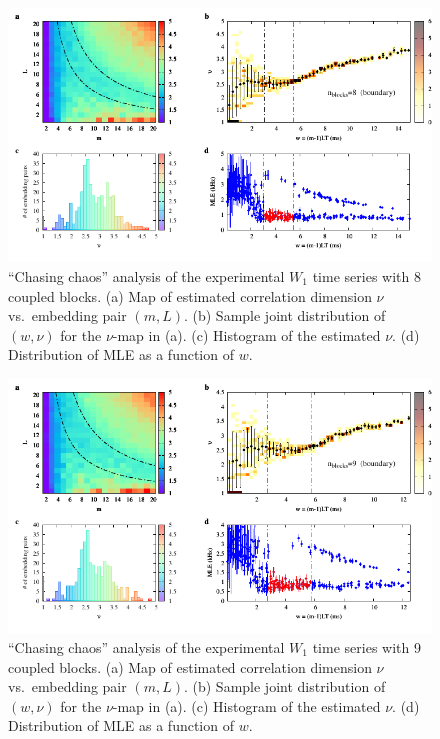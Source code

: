 \begin{appendices}
\begin{figure}[!htbp]
    \centering
    \includegraphics[width=\linewidth]{../blocks/8_blocks/2e5_points/plots/chaos_low.pdf}
    \caption{``Chasing chaos'' analysis of the experimental $W_1$ time series with 8 coupled blocks.
    (a) Map of estimated correlation dimension $\nu$ vs.\ embedding pair $(m, L)$.
    (b) Sample joint distribution of $(w,\nu)$ for the $\nu$-map in (a).
    (c) Histogram of the estimated $\nu$. (d) Distribution of MLE as a function of $w$.
    } 
\end{figure}

\begin{figure}[!htbp]
    \centering
    \includegraphics[width=\linewidth]{../blocks/9_blocks/edge/2e5_points/plots/chaos_low.pdf}
    \caption{``Chasing chaos'' analysis of the experimental $W_1$ time series with 9 coupled blocks.
    (a) Map of estimated correlation dimension $\nu$ vs.\ embedding pair $(m, L)$.
    (b) Sample joint distribution of $(w,\nu)$ for the $\nu$-map in (a).
    (c) Histogram of the estimated $\nu$. (d) Distribution of MLE as a function of $w$.
    } 
\end{figure}


\end{appendices}
